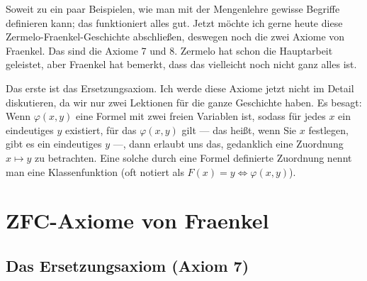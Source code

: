 \begin{spoken-clean}[01:19:48 - 01:21:39]
Soweit zu ein paar Beispielen, wie man mit der Mengenlehre gewisse Begriffe definieren kann; das funktioniert alles gut. Jetzt möchte ich gerne heute diese Zermelo-Fraenkel-Geschichte abschließen, deswegen noch die zwei Axiome von Fraenkel. Das sind die Axiome 7 und 8. Zermelo hat schon die Hauptarbeit geleistet, aber Fraenkel hat bemerkt, dass das vielleicht noch nicht ganz alles ist.

Das erste ist das Ersetzungsaxiom. Ich werde diese Axiome jetzt nicht im Detail diskutieren, da wir nur zwei Lektionen für die ganze Geschichte haben. Es besagt: Wenn $\varphi(x, y)$ eine Formel mit zwei freien Variablen ist, sodass für jedes $x$ ein eindeutiges $y$ existiert, für das $\varphi(x, y)$ gilt --- das heißt, wenn Sie $x$ festlegen, gibt es ein eindeutiges $y$ ---, dann erlaubt uns das, gedanklich eine Zuordnung $x \mapsto y$ zu betrachten. Eine solche durch eine Formel definierte Zuordnung nennt man eine Klassenfunktion (oft notiert als $F(x) = y \iff \varphi(x, y)$).
\end{spoken-clean}

\section{ZFC-Axiome von Fraenkel}

\subsection{Das Ersetzungsaxiom (Axiom 7)}

